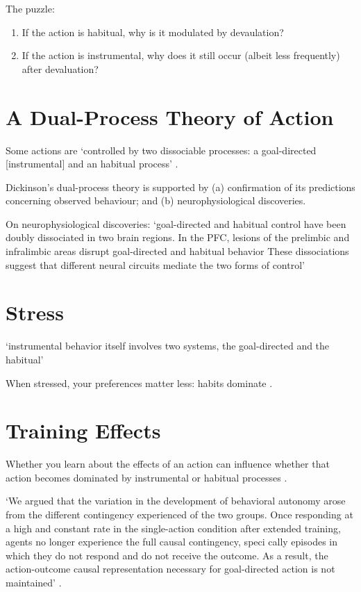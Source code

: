 \documentclass[12pt]{extarticle}
\begin{document}
\begin{multicols*}{3}
The puzzle:
\begin{enumerate}
  \item If the action is habitual, 
  why is it modulated by devaulation?
  
  \item If the action is instrumental, 
  why does it still occur (albeit less frequently) after devaluation?
\end{enumerate}
 
 
 
\section{A Dual-Process Theory of Action}
 
Some actions are ‘controlled by two dissociable processes: a goal-directed [instrumental] and an habitual process’
\citep{Dickinson:1985qp,dickinson:2016_instrumental}.

Dickinson’s dual-process theory is supported by (a) confirmation of its predictions concerning observed behaviour; and 
(b) neurophysiological discoveries.

On neurophysiological discoveries: ‘goal-directed and habitual control have been doubly dissociated in two brain regions.
In the PFC, lesions of the prelimbic and infralimbic areas disrupt goal-directed and habitual
behavior 
These dissociations suggest that different neural
circuits mediate the two forms of control’
\citep[p~184]{dickinson:2016_instrumental}

  
 
\section{Stress}
 
‘instrumental behavior itself involves two systems, the goal-directed and the habitual’
\citep[p.~12]{dickinson:2018_actions}
 
When stressed,
your preferences matter less:
habits dominate \citep{schwabe:2010_socially}.


\section{Training Effects}
Whether you learn about the effects of an action
can influence
whether that action becomes dominated by instrumental or habitual processes \citep{klossek:2011_choice}.

‘We argued that the variation in the development of behavioral autonomy arose from the different contingency experienced of the two groups. Once responding at a high and constant rate in the single-action condition after extended training, agents no longer experience the full causal contingency, speci cally episodes in which they do not respond and do not receive the outcome. As a result, the action-outcome causal representation necessary for goal-directed action is not maintained’
\citep[p.~181]{dickinson:2016_instrumental}.
 

\end{multicols*}
\end{document}
